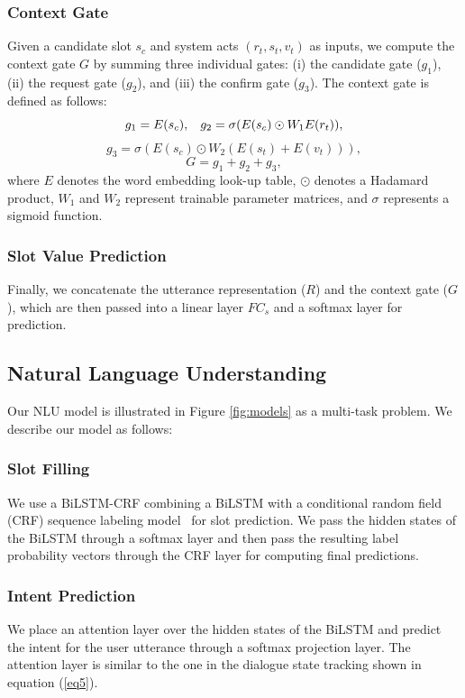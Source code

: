 \documentclass[letterpaper]{article} %
\begin{document}
\subsubsection{Context Gate}
Given a candidate slot $s_c$ and system acts $(r_t, s_t, v_t)$ as inputs, we compute the context gate $G$ by summing three individual gates: (i) the candidate gate ($g_1$), (ii) the request gate ($g_2$), and (iii) the confirm gate ($g_3$). The context gate is defined as follows:
\begin{equation}
    g_1 = E(s_c), \hspace{3mm} g_2 = \sigma(E(s_c) \odot W_1 E(r_t)),
\end{equation}
\begin{equation}
    g_3 = \sigma(E(s_c) \odot W_2 (E(s_t)+E(v_t))),
\end{equation}
\begin{equation}
    G = g_1 + g_2 + g_3,
\end{equation}
where $E$ denotes the word embedding look-up table, $\odot$ denotes a Hadamard product, $W_1$ and $W_2$ represent trainable parameter matrices, and $\sigma$ represents a sigmoid function.

\subsubsection{Slot Value Prediction}
Finally, we concatenate the utterance representation ($R$) and the context gate ($G$), which are then passed into a linear layer $FC_s$ and a softmax layer for prediction.

\subsection{Natural Language Understanding}
Our NLU model is illustrated in Figure \ref{fig:models} as a multi-task problem. We describe our model as follows:

\subsubsection{Slot Filling}
We use a BiLSTM-CRF combining a BiLSTM with a conditional random field (CRF) sequence labeling model~\cite{lample2016neural} for slot prediction. We pass the hidden states of the BiLSTM through a softmax layer and then pass the resulting label probability vectors through the CRF layer for computing final predictions.

\subsubsection{Intent Prediction}
We place an attention layer over the hidden states of the BiLSTM and predict the intent for the user utterance through a softmax projection layer. The attention layer is similar to the one in the dialogue state tracking shown in equation (\ref{eq5}).
\end{document}
